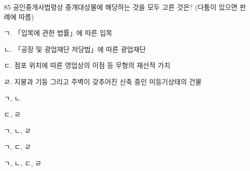 \begin{question}{85}
공인중개사법령상 중개대상물에 해당하는 것을 모두 고른 것은? (다툼이 있으면 판례에 따름)
\begin{framedtext}
ㄱ. 「입목에 관한 법률」에 따른 입목 \par
ㄴ. 「공장 및 광업재단 저당법」에 따른 광업재단 \par
ㄷ. 점포 위치에 따른 영업상의 이점 등 무형의 재산적 가치 \par
ㄹ. 지붕과 기둥 그리고 주벽이 갖추어진 신축 중인 미등기상태의 건물 \par
\end{framedtext}
\begin{choices}
  \item ㄱ, ㄴ
  \item ㄷ, ㄹ
  \item ㄱ, ㄴ, ㄹ
  \item ㄱ, ㄷ, ㄹ
  \item ㄱ, ㄴ, ㄷ, ㄹ
\end{choices}
\end{question}
